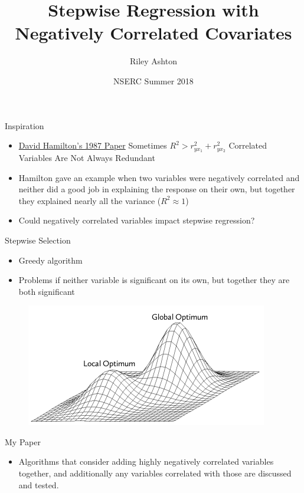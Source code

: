 \documentclass[ignorenonframetext,]{beamer}
\title{Stepwise Regression with Negatively Correlated Covariates}
\author{Riley Ashton}
\date{NSERC Summer 2018}
\providecommand{\tightlist}{%
  \setlength{\itemsep}{0pt}\setlength{\parskip}{0pt}}
\begin{document}
\frame{\titlepage}

\begin{frame}{Inspiration}

\begin{itemize}
\tightlist
\item
  \href{https://www.researchgate.net/profile/David_Hamilton23/publication/272559796_Sometimes_R_2_r_2_yx_1_r_2_yx_2_Correlated_Variables_Are_Not_Always_Redundant/links/557825c108ae753637548c1b.pdf}{David
  Hamilton's 1987 Paper} Sometimes \(R^2 > r^2_{yx_1} + r^2_{yx_2}\)
  Correlated Variables Are Not Always Redundant
\item
  Hamilton gave an example when two variables were negatively correlated
  and neither did a good job in explaining the response on their own,
  but together they explained nearly all the variance
  (\(R^2 \approx 1\))
\item
  Could negatively correlated variables impact stepwise regression?
\end{itemize}

\end{frame}

\begin{frame}{Stepwise Selection}

\begin{itemize}
\tightlist
\item
  Greedy algorithm
\item
  Problems if neither variable is significant on its own, but together
  they are both significant
\end{itemize}

\begin{figure}
\centering
\includegraphics{./local_optimum.png}
\caption{}
\end{figure}

\end{frame}

\begin{frame}{My Paper}

\begin{itemize}
\tightlist
\item
  Algorithms that consider adding highly negatively correlated variables
  together, and additionally any variables correlated with those are
  discussed and tested.
\end{itemize}

\end{frame}
\end{document}
